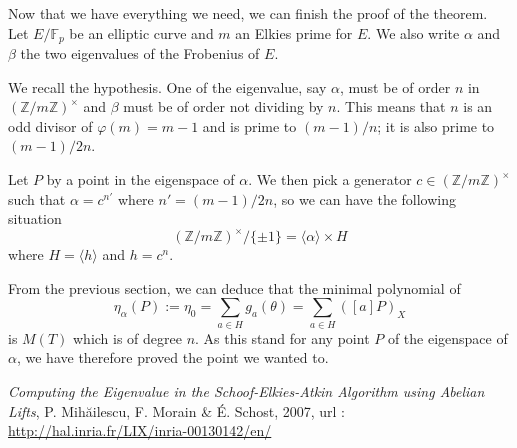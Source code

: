 \documentclass[a4paper]{article} %
\newcommand\zmodninv[1]{(\mathbb{Z}/#1\mathbb{Z})^{\times}}
\newcommand\GF[1]{\mathbb{F}_{#1}}
\newcommand\groupgen[1]{\langle{#1}\rangle}
\begin{document}
Now that we have everything we need, we can finish the proof of the
theorem.
Let $E/\GF{p}$ be an elliptic curve and $m$ an Elkies prime for $E$. We also write
$\alpha$ and $\beta$ the two eigenvalues of the Frobenius of $E$.\par
We recall the hypothesis. One of the eigenvalue, say $\alpha$, must be of order $n$
in $\zmodninv{m}$ and $\beta$ must be of order not dividing by $n$. This means
that $n$ is an odd divisor of $\varphi(m) = m-1$ and is prime to $(m-1)/n$; it 
is also prime to $(m-1)/2n$.\par
Let $P$ by a point in the eigenspace of $\alpha$. We then pick a generator
$c\in\zmodninv{m}$ such that $\alpha = c^{n'}$ where $n' = (m-1)/2n$, so we can
have the following situation
\begin{equation}
\zmodninv{m}/\lbrace{\pm1\rbrace} = \groupgen{\alpha}\times H
\end{equation}
where $H = \groupgen{h}$ and $h = c^n$.\par
From the previous section, we can deduce that the minimal polynomial of
\begin{equation}
\eta_{\alpha}(P) := \eta_0 = \sum_{a\in H}{g_a(\theta)} = \sum_{a\in
H}{([a]P)_X}
\end{equation}
is $M(T)$ which is of degree $n$. As this stand for any point $P$ of the
eigenspace of $\alpha$, we have therefore proved the point we wanted to.

\begin{thebibliography}{LC}

 \emph{Computing the Eigenvalue in the Schoof-Elkies-Atkin
Algorithm using Abelian Lifts}, P. Mih\u{a}ilescu, F. Morain \&
É. Schost, 2007, url :
\url{http://hal.inria.fr/LIX/inria-00130142/en/}

\end{thebibliography}
\end{document}

